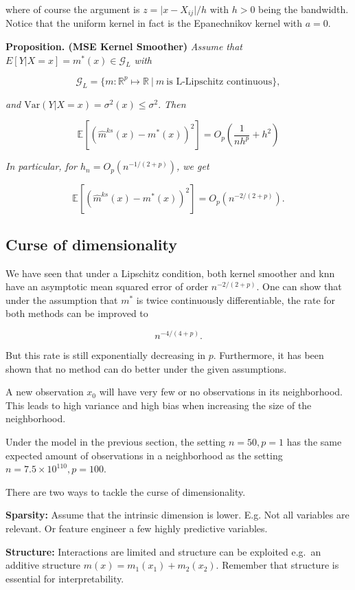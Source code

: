 \documentclass[a4paper,12pt,openany]{book}
\begin{document}
where of course the argument is \(z=\vert x-X_{ij}\vert/h\) with \(h>0\) being the bandwidth. Notice that the uniform kernel in fact is the Epanechnikov kernel with \(a=0\).

\textbf{Proposition. (MSE Kernel Smoother)} \emph{Assume that \(E[Y|X=x]=m^\ast(x)\in \mathcal G_L\) with}

\[
\mathcal G_L = \{m: \mathbb R^p \mapsto \mathbb R\ |\  m \ \text{is L-Lipschitz continuous}\},
\]

\emph{and \(\textrm{Var}(Y|X=x)=\sigma^2(x)\leq \sigma^2.\) Then }

\[
\mathbb E[(\hat m^{ks}(x)-m^\ast(x))^2]= O_p\left( \frac{1}{nh^p} + h^2 \right)
\]

\emph{In particular, for \(h_n=O_p(n^{-1/(2+p)})\), we get }

\[
\mathbb E[(\hat m^{ks}(x)-m^\ast(x))^2]=O_p(n^{-2/(2+p)}).
\]

\hypertarget{curse-of-dimensionality}{%
\subsection{Curse of dimensionality}\label{curse-of-dimensionality}}

We have seen that under a Lipschitz condition, both kernel smoother and knn have an asymptotic mean squared error of order \(n^{-2/(2+p)}\). One can show that under the assumption that \(m^\ast\) is twice continuously differentiable, the rate for both methods can be improved to

\[
n^{-4/(4+p)}.
\]

But this rate is still exponentially decreasing in \(p\). Furthermore, it has been shown that no method can do better under the given assumptions.

A new observation \(x_0\) will have very few or no observations in its neighborhood. This leads to high variance and high bias when increasing the size of the neighborhood.

Under the model in the previous section, the setting \(n=50,p=1\) has the same expected amount of observations in a neighborhood as the setting \(n=7.5\times10^{110}, p=100\).

There are two ways to tackle the curse of dimensionality.

\textbf{Sparsity:} Assume that the intrinsic dimension is lower. E.g. Not all variables are relevant. Or feature engineer a few highly predictive variables.

\textbf{Structure:} Interactions are limited and structure can be exploited
e.g.~an additive structure \(m(x)=m_1(x_1)+m_2(x_2)\). Remember that structure is essential for interpretability.
\end{document}
